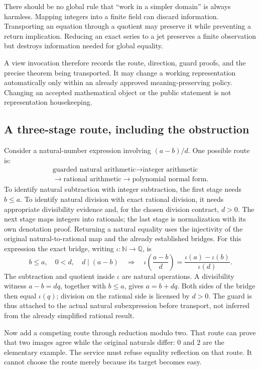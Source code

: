 \documentclass[11pt,a4paper]{article}
\newcommand{\N}{\mathbb N}\newcommand{\Z}{\mathbb Z}
\newcommand{\Q}{\mathbb Q}\newcommand{\R}{\mathbb R}
\theoremstyle{remark}\newtheorem{example}[proposition]{Example}
\begin{document}
There should be no global rule that ``work in a simpler domain'' is always harmless. Mapping integers into a finite field can discard information. Transporting an equation through a quotient may preserve it while preventing a return implication. Reducing an exact series to a jet preserves a finite observation but destroys information needed for global equality.

A view invocation therefore records the route, direction, guard proofs, and the precise theorem being transported. It may change a working representation automatically only within an already approved meaning-preserving policy. Changing an accepted mathematical object or the public statement is not representation housekeeping.

\subsection{A three-stage route, including the obstruction}
Consider a natural-number expression involving $(a-b)/d$. One possible route is:
\[
 \begin{gathered}
 \text{guarded natural arithmetic} \longrightarrow \text{integer arithmetic}\\
 \longrightarrow \text{rational arithmetic} \longrightarrow \text{polynomial normal form}.
 \end{gathered}
\]
To identify natural subtraction with integer subtraction, the first stage needs $b\leq a$. To identify natural division with exact rational division, it needs appropriate divisibility evidence and, for the chosen division contract, $d>0$. The next stage maps integers into rationals; the last stage is normalization with its own denotation proof. Returning a natural equality uses the injectivity of the original natural-to-rational map and the already established bridges. For this expression the exact bridge, writing $\iota:\N\to\Q$, is
\[
 b\leq a,\quad 0<d,\quad d\mid(a-b)
 \quad\Longrightarrow\quad
 \iota\!\left(\frac{a-b}{d}\right)
 =\frac{\iota(a)-\iota(b)}{\iota(d)}.
\]
The subtraction and quotient inside $\iota$ are natural operations. A divisibility witness $a-b=dq$, together with $b\leq a$, gives $a=b+dq$. Both sides of the bridge then equal $\iota(q)$; division on the rational side is licensed by $d>0$. The guard is thus attached to the actual natural subexpression before transport, not inferred from the already simplified rational result.

Now add a competing route through reduction modulo two. That route can prove that two images agree while the original naturals differ: $0$ and $2$ are the elementary example. The service must refuse equality reflection on that route. It cannot choose the route merely because its target becomes easy.
\end{document}
